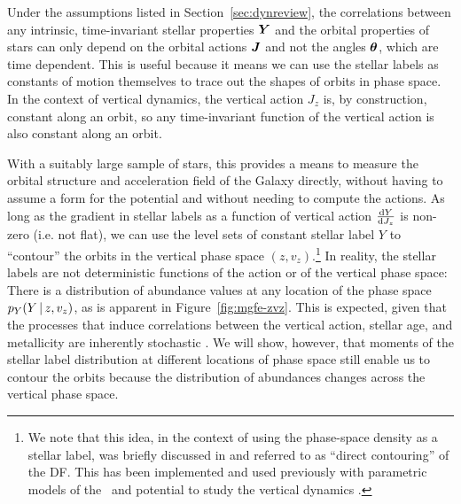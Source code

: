 \documentclass[modern]{aastex631}
\begin{document}
Under the assumptions listed in Section~\ref{sec:dynreview}, the correlations between
any intrinsic, time-invariant stellar properties $\boldsymbol{Y}$ and the orbital properties of
stars can only depend on the orbital actions $\boldsymbol{J}$ and not the angles $\boldsymbol{\theta}$,
which are time dependent.
This is useful because it means we can use the stellar labels as constants of motion
themselves to trace out the shapes of orbits in phase space.
In the context of vertical dynamics, the vertical action $J_z$ is, by construction,
constant along an orbit, so any time-invariant function of the vertical action is also
constant along an orbit.

With a suitably large sample of stars, this provides a means to measure the orbital
structure and acceleration field of the Galaxy directly, without having to assume a form
for the potential and without needing to compute the actions.
As long as the gradient in stellar labels as a function of vertical action
$\frac{\mathrm{d}{Y}}{\mathrm{d}{J_z}}$ is non-zero (i.e. not flat), we can use the level sets of constant
stellar label $Y$ to ``contour'' the orbits in the vertical phase space $(z,
v_z)$.\footnote{We note that this idea, in the context of using the phase-space density
as a stellar label, was briefly discussed in \citet{Kuijken:1989a} and referred to as
``direct contouring'' of the DF. This has been implemented and used previously with
parametric models of the \df\ and potential to study the vertical dynamics
\cite{Li:2021, Li:2023}.}
In reality, the stellar labels are not deterministic functions of the action or of the
vertical phase space: There is a distribution of abundance values at any location of the
phase space $p_Y(Y \,|\, z, v_z)$, as is apparent in Figure~\ref{fig:mgfe-zvz}.
This is expected, given that the processes that induce correlations between the vertical
action, stellar age, and metallicity are inherently stochastic \citep{Nordstrom:2004,
Hayden:2022}.
We will show, however, that moments of the stellar label distribution at different
locations of phase space still enable us to contour the orbits because the distribution
of abundances changes across the vertical phase space.
\end{document}
